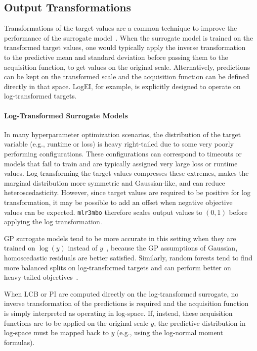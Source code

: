\subsection*{Output Transformations}
\label{sec:output-transformations}

Transformations of the target values are a common technique to improve the performance of the surrogate model~\cite{jones1998}.
When the surrogate model is trained on the transformed target values, one would typically apply the inverse transformation to the predictive mean and standard deviation before passing them to the acquisition function, to get values on the original scale.
Alternatively, predictions can be kept on the transformed scale and the acquisition function can be defined directly in that space.
LogEI, for example, is explicitly designed to operate on log-transformed targets.

\paragraph{Log-Transformed Surrogate Models}

In many hyperparameter optimization scenarios, the distribution of the target variable (e.g., runtime or loss) is heavy right-tailed due to some very poorly performing configurations.
These configurations can correspond to timeouts or models that fail to train and are typically assigned very large loss or runtime values.
Log-transforming the target values compresses these extremes, makes the marginal distribution more symmetric and Gaussian-like, and can reduce heteroscedasticity.
However, since target values are required to be positive for log transformation, it may be possible to add an offset when negative objective values can be expected.
\texttt{mlr3mbo} therefore scales output values to $(0, 1)$ before applying the log transformation.

GP surrogate models tend to be more accurate in this setting when they are trained on $\log(y)$ instead of $y$~\cite{jones1998,hutter2009}, because the GP assumptions of Gaussian, homoscedastic residuals are better satisfied.
Similarly, random forests tend to find more balanced splits on log-transformed targets and can perform better on heavy-tailed objectives~\cite{lindauer2019}.

When LCB or PI are computed directly on the log-transformed surrogate, no inverse transformation of the predictions is required and the acquisition function is simply interpreted as operating in log-space.
If, instead, these acquisition functions are to be applied on the original scale $y$, the predictive distribution in log-space must be mapped back to $y$ (e.g., using the log-normal moment formulas).

